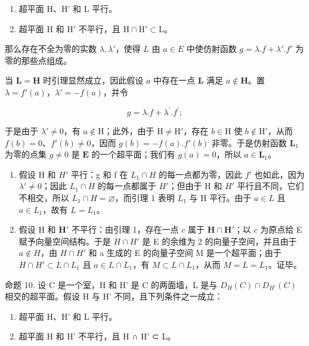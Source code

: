 \begin{enumerate}
\def\labelenumi{\alph{enumi})}
\item
  超平面 H、H' 和 L 平行。
\item
  超平面 H 和 \(\mathrm{H}'\) 不平行，且 \(\mathrm{H} \cap \mathrm{H}' \subset \mathrm{L}\)。
\end{enumerate}

那么存在不全为零的实数 \(\lambda, \lambda'\)，使得 \(L\) 由 \(a \in E\) 中使仿射函数 \(g = \lambda.f + \lambda'.f'\) 为零的那些点组成。

当 \(\mathbf{L} = \mathbf{H}\) 时引理显然成立，因此假设 \(a\) 中存在一点 \(\mathbf{L}\) 满足 \(a \notin \mathbf{H}\)。置 \(\lambda = f'(a)\)，\(\lambda' = -f(a)\)，并令

\[
g = \lambda . f + \lambda^ {\prime}. f ^ {\prime};
\]

于是由于 \(\lambda' \neq 0\)，有 \(a \notin \mathrm{H}\)；此外，由于 \(\mathrm{H} \neq \mathrm{H}'\)，存在 \(b \in \mathrm{H}\) 使 \(b \notin \mathrm{H}'\)，从而 \(f(b) = 0\)、\(f'(b) \neq 0\)，因而 \(g(b) = -f(a).f'(b)\) 非零。于是仿射函数 \(\mathbf{L}_1\) 为零的点集 \(g \neq 0\) 是 \(\mathbf{E}\) 的一个超平面；我们有 \(g(a) = 0\)，所以 \(a \in \mathbf{L}_1\)。

\begin{enumerate}
\def\labelenumi{\alph{enumi})}
\item
  假设 H 和 \(H'\) 平行：g 和 f 在 \(L_{1} \cap H\) 的每一点都为零，因此 \(f'\) 也如此，因为 \(\lambda' \neq 0\)；因此 \(L_{1} \cap H\) 的每一点都属于 \(H'\)；但由于 H 和 \(H'\) 平行且不同，它们不相交，所以 \(L_{1} \cap H = \varnothing\)，而引理 1 表明 \(L_{1}\) 与 H 平行。由于 \(a \in L\) 且 \(a \in L_{1}\)，故有 \(L = L_{1}\)。
\item
  假设 H 和 \(\mathbf{H}'\) 不平行：由引理 1，存在一点 \(c\) 属于 \(\mathbf{H} \cap \mathbf{H}'\)；以 \(c\) 为原点给 E 赋予向量空间结构。于是 \(H \cap H'\) 是 E 的余维为 2 的向量子空间，并且由于 \(a \notin H\)，由 \(H \cap H'\) 和 a 生成的 E 的向量子空间 M 是一个超平面；由于 \(H \cap H' \subset L \cap L_1\) 且 \(a \in L \cap L_1\)，有 \(M \subset L \cap L_1\)，从而 \(M = L = L_1\)。证毕。
\end{enumerate}

命题 10. 设 C 是一个室，H 和 H' 是 C 的两面墙，L 是与 \(D_{H}(C) \cap D_{H'}(C)\) 相交的超平面。假设 H 与 H' 不同，且下列条件之一成立：

\begin{enumerate}
\def\labelenumi{\alph{enumi})}
\item
  超平面 H、H' 和 L 平行。
\item
  超平面 H 和 H' 不平行，且 H ∩ H' ⊂ L。
\end{enumerate}


